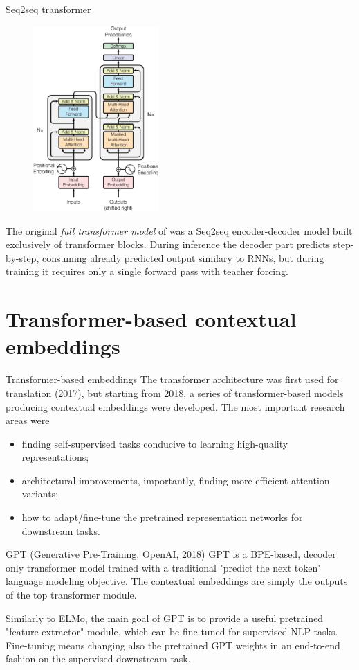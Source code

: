 \documentclass[style=upen, size=14pt]{powerdot}
\theoremstyle{definition}
\begin{document}
\begin{slide}[toc=Seq2seq]{Seq2seq transformer}
    \begin{figure}
    \includegraphics[width=4.8cm]{figures/transformer_full.eps}
  \end{figure}
  The original \emph{full transformer model} of \citep{vaswani2017attention} was
  a Seq2seq encoder-decoder model built exclusively of transformer blocks.
  During inference the decoder part predicts step-by-step, consuming already
  predicted output similary to RNNs, but during training it requires only a
  single forward pass with teacher forcing.
\end{slide}

\section{Transformer-based contextual embeddings}

\begin{slide}[toc=Introduction]{Transformer-based embeddings}
  The transformer architecture was first used for translation (2017), but
  starting from 2018, a series of transformer-based models producing contextual
  embeddings were developed. The most important research areas were
  \begin{itemize}
  \item finding self-supervised tasks conducive to learning high-quality
    representations;
  \item architectural improvements, importantly, finding more efficient attention variants;
  \item how to adapt/fine-tune the pretrained representation networks for
    downstream tasks.
  \end{itemize}
\end{slide}

\begin{slide}[toc=GPT]{GPT (Generative Pre-Training, OpenAI, 2018)}
  GPT is a BPE-based, decoder only transformer model trained with a
  traditional "predict the next token" language modeling objective. The
  contextual embeddings are simply the outputs of the top transformer module.\bigskip

  Similarly to ELMo, the main goal of GPT is to provide a useful pretrained
  "feature extractor" module, which can be fine-tuned for supervised NLP tasks.
  Fine-tuning means changing also the pretrained GPT weights in an end-to-end
  fashion on the supervised downstream task.
\end{slide}
\end{document}

